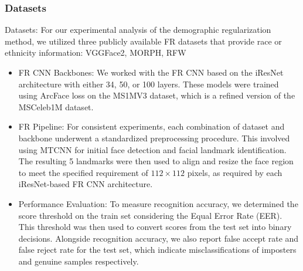 \documentclass[12pt]{article}
\begin{document}
\subsubsection{Datasets}
Datasets: For our experimental analysis of the demographic regularization method, we utilized three publicly
available FR datasets that provide race or ethnicity information: VGGFace2, MORPH, RFW
\begin{itemize}
  \item FR CNN Backbones: We worked with the FR CNN based
  on the iResNet architecture with either 34, 50, or 100 layers. These models were trained using ArcFace loss on
  the MS1MV3 dataset, which is a refined version of the MSCeleb1M dataset.
  \item FR Pipeline: For consistent experiments, each combination of dataset and backbone underwent a standardized preprocessing procedure. This involved using MTCNN for initial face detection and facial landmark identification. The
  resulting 5 landmarks were then used to align and resize the
  face region to meet the specified requirement of $112 \times 112$
  pixels, as required by each iResNet-based FR CNN architecture. 
  \item Performance Evaluation: To measure recognition accuracy, we determined the score threshold on the train set considering the Equal Error Rate (EER). This threshold was
  then used to convert scores from the test set into binary
  decisions. Alongside recognition accuracy, we also report
  false accept rate and false reject rate for the test set, which
  indicate misclassifications of imposters and genuine samples respectively.
\end{itemize}
\end{document}
